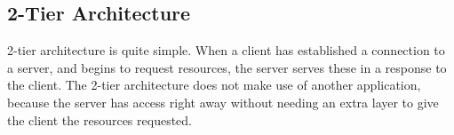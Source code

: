 \subsection{2-Tier Architecture}

2-tier architecture is quite simple. When a client has established a connection to a server, 
and begins to request resources, the server serves these in a response to the client. The 2-tier 
architecture does not make use of another application, because 
the server has access right away without needing an extra layer to give 
the client the resources requested\cite{tierserverclient08}.